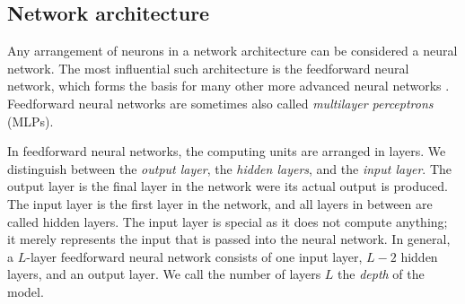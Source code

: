 \begin{comment}
One common activation function is the \emph{logistic sigmoid}:

\begin{equation}
\sigma(x) = \frac1{1+e^{-x}}.
\end{equation}

\begin{figure}
	\begin{center}
		
	\end{center}
	\caption{The logistic sigmoid function.}
	\label{fig:sigmoid}
\end{figure}

As shown in Fig. \ref{fig:sigmoid}, $\sigma(x)$ squashes the output to a value between 0 and 1. A very similar function, producing an output between -1 and 1, is $\tanh(x)$. Lastly, one of the most commonly used activation functions is the \emph{rectified linear} function $g(x) = \max\{0,x\}$ plotted in Fig. \ref{fig:relu}.

\begin{figure}
	\begin{center}
		
	\end{center}
	\caption{The rectified linear function.}
	\label{fig:relu}
\end{figure}

The choice of activation function is an important design decision that can greatly influence how well the model learns. The rectified linear function is a very good default choice, as it has shown to outperform other functions in a variety of different model architectures \cite{DBLP:journals/jmlr/GlorotBB11 ,DBLP:conf/nips/KrizhevskySH12}. We will see why some functions work better than others in Section \ref{sec:training}.
\end{comment}

\subsection{Network architecture}
Any arrangement of neurons in a network architecture can be considered a neural network. The most influential such architecture is the feedforward neural network, which forms the basis for many other more advanced neural networks \cite[Ch.6, p. 163]{DBLP:books/daglib/0040158}. Feedforward neural networks are sometimes also called \emph{multilayer perceptrons} (MLPs).

In feedforward neural networks, the computing units are arranged in layers. We distinguish between the \emph{output layer}, the \emph{hidden layers}, and the \emph{input layer}. The output layer is the final layer in the network were its actual output is produced. The input layer is the first layer in the network, and all layers in between are called hidden layers. The input layer is special as it does not compute anything; it merely represents the input that is passed into the neural network. In general, a $L$-layer feedforward neural network consists of one input layer, $L-2$ hidden layers, and an output layer. We call the number of layers $L$ the \emph{depth} of the model.

